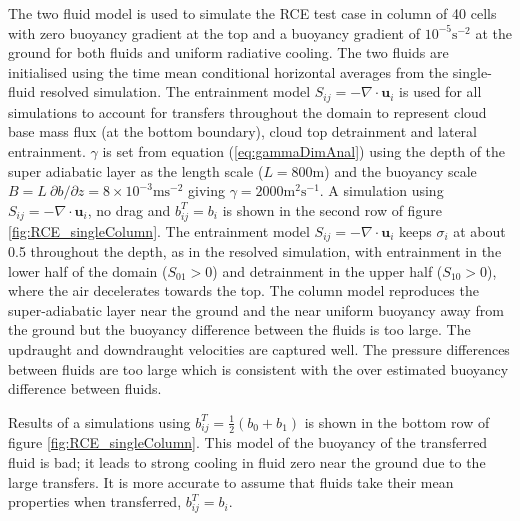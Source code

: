 \documentclass[draft]{agujournal2019}
\begin{document}
The two fluid model is used to simulate the RCE test case in 
column of 40 cells with zero buoyancy gradient at the top and a buoyancy
gradient of $10^{-5}\text{s}^{-2}$ at the ground for both fluids
and uniform radiative cooling. The two fluids are initialised using
the time mean conditional horizontal averages from the single-fluid
resolved simulation. The entrainment model $S_{ij}=-\nabla\cdot\mathbf{u}_{i}$
is used for all simulations to account for transfers throughout the
domain to represent cloud base mass flux (at the bottom boundary),
cloud top detrainment and lateral entrainment. $\gamma$ is set from
equation (\ref{eq:gammaDimAnal}) using the depth of the super adiabatic
layer as the length scale ($L=800\text{m}$) and the buoyancy scale
$B=L\ \partial b/\partial z=8\times10^{-3}\text{m}\text{s}^{-2}$
giving $\gamma=2000\text{m}^{2}\text{s}^{-1}$. A simulation using
$S_{ij}=-\nabla\cdot\mathbf{u}_{i}$, no drag and $b_{ij}^{T}=b_{i}$
is shown in the second row of figure \ref{fig:RCE_singleColumn}.
The entrainment model $S_{ij}=-\nabla\cdot\mathbf{u}_{i}$ keeps $\sigma_{i}$
at about 0.5 throughout the depth, as in the resolved simulation,
with entrainment in the lower half of the domain ($S_{01}>0$) and
detrainment in the upper half ($S_{10}>0$), where the air decelerates
towards the top. The  column model reproduces the super-adiabatic
layer near the ground and the near uniform buoyancy away from the
ground but the buoyancy difference between the fluids is too large.
The updraught and downdraught velocities are captured well. The pressure
differences between fluids are too large which is consistent with
the over estimated buoyancy difference between fluids. 

Results of a simulations using $b_{ij}^{T}=\frac{1}{2}(b_{0}+b_{1})$
is shown in the bottom row of figure \ref{fig:RCE_singleColumn}.
This model of the buoyancy of the transferred fluid is bad; it leads
to strong cooling in fluid zero near the ground due to the large transfers.
It is more accurate to assume that fluids take their mean properties
when transferred, $b_{ij}^{T}=b_{i}$. 
\end{document}
